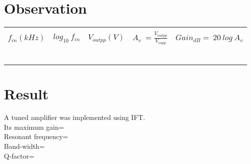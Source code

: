 \section*{Observation}
\begin{center}

\begin{tabular}{|l|l|l|l|l|}

\hline
  & & & &\\
 
$f_{in} (kHz) $  & $log_{10}\ f_{in}$  &  $V_{outpp}(V)$ & $A_v\ =\frac{V_{outpp}}{V_{inpp}} $ & $Gain_{dB}=\ 20\ log\ A_v$ \\ \hline
 & & & &\\ \hline
& & & &\\ \hline
& & & &\\ \hline
& & & &\\ \hline
& & & &\\ \hline
& & & &\\ \hline

\end{tabular}
\end{center}
\section*{Result}
A tuned amplifier was implemented using IFT.\\
Its maximum gain= \\
Resonant frequency= \\
Band-width=\\
Q-factor= 
